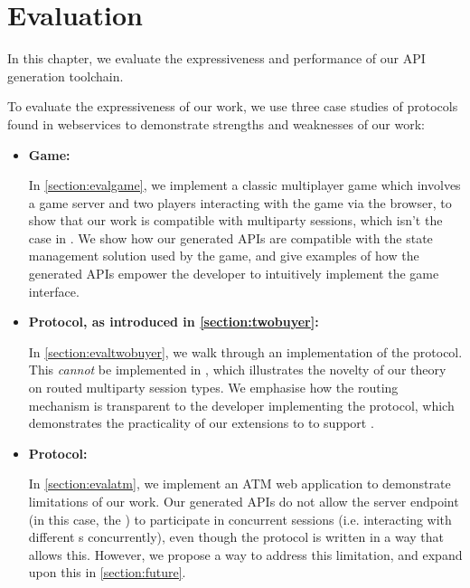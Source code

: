 \chapter{Evaluation}
\label{chap:eval}

In this chapter, we
evaluate the expressiveness
and performance of our API generation
toolchain.


To evaluate the expressiveness
of our work,
we use three case studies
of protocols found in webservices
to demonstrate strengths and weaknesses
of our work:

\begin{itemize}

\item
\textbf{ Game:}

In \cref{section:evalgame},
we implement a classic multiplayer game which involves a game server
and two players interacting with the game via the browser,
to show that our work is compatible with multiparty sessions,
which isn't the case in \cite{MVU2020,Exceptional}.
We show how our generated APIs are compatible with the
state management solution used by the game, and give examples of 
how the generated APIs empower the developer to intuitively 
implement the game interface.

\item
\textbf{ Protocol, as introduced in \cref{section:twobuyer}:}

In \cref{section:evaltwobuyer},
we walk through an implementation of the 
protocol. This \textit{cannot} be implemented in
\cite{PureScript2019,MVU2020}, which illustrates the novelty
of our \newtheory theory on routed multiparty session types.
We emphasise how the routing mechanism is transparent to the
developer implementing the protocol, which demonstrates
the practicality of our extensions to \codegen to support
\newtheory.

\item
\textbf{ Protocol:}

In \cref{section:evalatm},
we implement an ATM web application to demonstrate
limitations of our work. Our generated APIs do not allow
the server endpoint (in this case, the )
to participate in concurrent sessions (i.e. interacting
with different s concurrently), even though
the protocol is written in a way that allows this.
However, we propose a way to address this limitation, and expand
upon this in \cref{section:future}.

\end{itemize}


